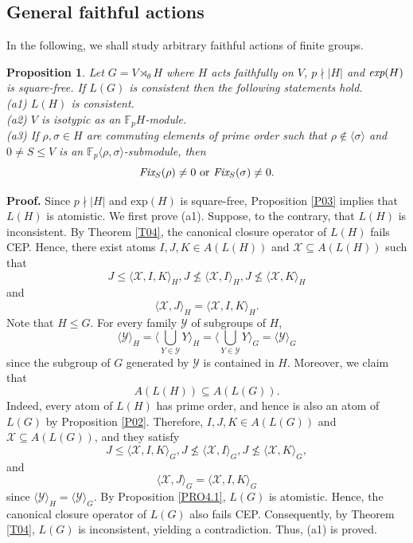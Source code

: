 \documentclass[12pt]{article}
\newtheorem{proposition}{\bf Proposition}[section]
\def\proof{{\bf Proof.} }
\begin{document}
\subsection{General faithful actions}
In the following, we shall study arbitrary faithful actions of finite groups.
\begin{proposition}\label{PPOO}
Let $G=V\rtimes_\theta H$ where $H$ acts faithfully on $V$, 
$p\nmid |H|$ and $\emph{exp}(H)$ is square-free. If $L(G)$ is consistent then the following statements hold.\\
(a1) $L(H)$ is consistent.\\
(a2) $V$ is isotypic as an $\mathbb{F}_pH$-module.\\
(a3) If $\rho, \sigma\in H$ are commuting elements of prime order such that $\rho\notin \langle\sigma\rangle$ and $0\neq S\leq V$ is an $\mathbb{F}_p\langle \rho, \sigma\rangle$-submodule, then 
$$\emph{Fix}_{S}(\rho)\neq 0 \mbox{ or } \emph{Fix}_{S}(\sigma)\neq 0.$$
\end{proposition}
\proof
Since $p\nmid |H|$ and $\mbox{exp}(H)$ is square-free, Proposition \ref{P03} implies that $L(H)$ is atomistic. We first prove (a1). Suppose, to the contrary, that $L(H)$ is inconsistent. 
By Theorem \ref{T04}, the canonical closure operator of $L(H)$ fails CEP. Hence, there exist atoms $I, J, K \in A(L(H))$ and $\mathcal{X}\subseteq A(L(H))$ such that
$$J\leq \langle \mathcal{X}, I, K\rangle_{H}, J\nleq \langle \mathcal{X}, I\rangle_{H}, J\nleq \langle \mathcal{X}, K\rangle_{H}$$
and
$$\langle \mathcal{X}, J\rangle_{H}=\langle \mathcal{X}, I, K\rangle_{H}.$$
Note that $H\leq G$. For every family $\mathcal{Y}$ of subgroups of $H$,
$$\langle\mathcal{Y}\rangle_H=
\langle\bigcup_{Y\in\mathcal{Y}}Y\rangle_H=
\langle\bigcup_{Y\in\mathcal{Y}}Y\rangle_G=\langle\mathcal{Y}\rangle_G$$
since the subgroup of $G$ generated by $\mathcal{Y}$ is contained in $H$.
Moreover, we claim that $$A(L(H))\subseteq A(L(G)).$$ 
Indeed, every atom of $L(H)$ has prime 
order, and hence is also an atom of $L(G)$ by Proposition \ref{P02}. 
Therefore, $I,J,K\in A(L(G))$ and $\mathcal{X}\subseteq A(L(G))$, and they satisfy
$$J\leq \langle \mathcal{X}, I, K\rangle_{G}, J\nleq \langle \mathcal{X}, I\rangle_{G}, J\nleq \langle \mathcal{X}, K\rangle_{G},$$
and
$$\langle \mathcal{X}, J\rangle_{G}=\langle \mathcal{X}, I, K\rangle_{G}$$
since $\langle\mathcal{Y}\rangle_{H}= \langle\mathcal{Y}\rangle_G$.
By Proposition \ref{PRO4.1}, $L(G)$ is atomistic. Hence, the canonical closure operator of $L(G)$ also fails CEP. Consequently, by Theorem \ref{T04}, $L(G)$ is inconsistent, yielding a contradiction. Thus, (a1) is proved. 
\end{document}
